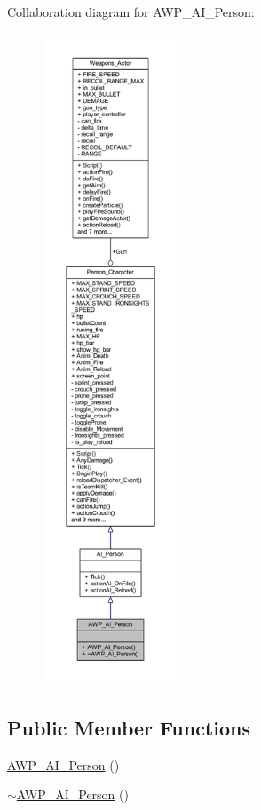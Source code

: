 Collaboration diagram for A\+W\+P\+\_\+\+A\+I\+\_\+\+Person\+:\nopagebreak
\begin{figure}[H]
\begin{center}
\leavevmode
\includegraphics[height=550pt]{class_a_w_p___a_i___person__coll__graph}
\end{center}
\end{figure}
\subsection*{Public Member Functions}
\begin{DoxyCompactItemize}
\item 
\hyperlink{class_a_w_p___a_i___person_a90c8dc4ce858341203965f1dfac61aa8}{A\+W\+P\+\_\+\+A\+I\+\_\+\+Person} ()
\item 
\hyperlink{class_a_w_p___a_i___person_a148e095cce4c33df7c2468990bfdc7fe}{$\sim$\+A\+W\+P\+\_\+\+A\+I\+\_\+\+Person} ()
\end{DoxyCompactItemize}
